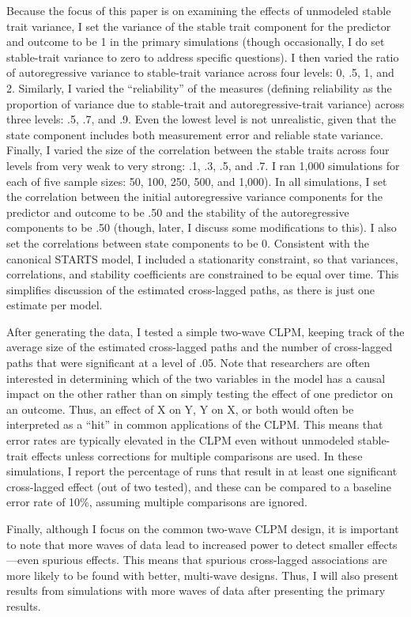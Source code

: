 \documentclass[
  english,
  man,floatsintext]{apa6}
\begin{document}
Because the focus of this paper is on examining the effects of unmodeled stable trait variance, I set the variance of the stable trait component for the predictor and outcome to be 1 in the primary simulations (though occasionally, I do set stable-trait variance to zero to address specific questions). I then varied the ratio of autoregressive variance to stable-trait variance across four levels: 0, .5, 1, and 2. Similarly, I varied the ``reliability'' of the measures (defining reliability as the proportion of variance due to stable-trait and autoregressive-trait variance) across three levels: .5, .7, and .9. Even the lowest level is not unrealistic, given that the state component includes both measurement error and reliable state variance. Finally, I varied the size of the correlation between the stable traits across four levels from very weak to very strong: .1, .3, .5, and .7. I ran 1,000 simulations for each of five sample sizes: 50, 100, 250, 500, and 1,000). In all simulations, I set the correlation between the initial autoregressive variance components for the predictor and outcome to be .50 and the stability of the autoregressive components to be .50 (though, later, I discuss some modifications to this). I also set the correlations between state components to be 0. Consistent with the canonical STARTS model, I included a stationarity constraint, so that variances, correlations, and stability coefficients are constrained to be equal over time. This simplifies discussion of the estimated cross-lagged paths, as there is just one estimate per model.

After generating the data, I tested a simple two-wave CLPM, keeping track of the average size of the estimated cross-lagged paths and the number of cross-lagged paths that were significant at a level of .05. Note that researchers are often interested in determining which of the two variables in the model has a causal impact on the other rather than on simply testing the effect of one predictor on an outcome. Thus, an effect of X on Y, Y on X, or both would often be interpreted as a ``hit'' in common applications of the CLPM. This means that error rates are typically elevated in the CLPM even without unmodeled stable-trait effects unless corrections for multiple comparisons are used. In these simulations, I report the percentage of runs that result in at least one significant cross-lagged effect (out of two tested), and these can be compared to a baseline error rate of 10\%, assuming multiple comparisons are ignored.

Finally, although I focus on the common two-wave CLPM design, it is important to note that more waves of data lead to increased power to detect smaller effects---even spurious effects. This means that spurious cross-lagged associations are more likely to be found with better, multi-wave designs. Thus, I will also present results from simulations with more waves of data after presenting the primary results.
\end{document}
